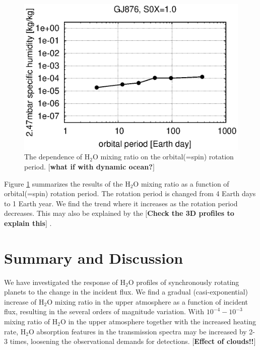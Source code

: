 \documentclass[11pt,numberedappendix,twocolappendix,]{emulateapj}
\def\water{H$_2$O }
\def\memo#1{\color{red}$[${\bf #1}$]$ \color{black}}
\begin{document}
\begin{figure}[!h]
    \begin{center}
    \includegraphics[width=\hsize]{fig/AqOH0TLS_GJ876_q_sensitivity_changeP.eps}
    \end{center}
\caption{The dependence of \water mixing ratio on the orbital(=spin) rotation period. \memo{what if with dynamic ocean?}}                                                                                                             
\label{fig:changeP}
\end{figure}

Figure \ref{fig:changeP} summarizes the results of the \water mixing ratio as a function of orbital(=spin) rotation period. 
The rotation period is changed from 4 Earth days to 1 Earth year. 
We find the trend where it increases as the rotation period decreases. 
This may also be explained by the \memo{Check the 3D profiles to explain this}. 


\section{Summary and Discussion}
\label{s:summary}

We have investigated the response of \water profiles of synchronously rotating planets to the change in the incident flux. 
We find a gradual (casi-exponential) increase of \water mixing ratio in the upper atmosphere as a function of incident flux, resulting in the several orders of magnitude variation. 
With $10^{-4}-10^{-3}$ mixing ratio of \water in the upper atmosphere together with the increased heating rate, \water absorption features in the transmission spectra may be increased by 2-3 times, loosening the observational demands for detections. 
\memo{Effect of clouds!!}
\end{document}
